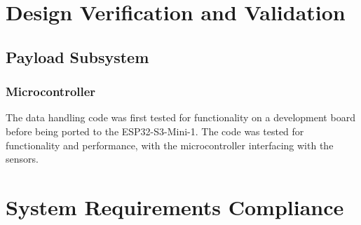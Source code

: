 \documentclass{report}
\begin{document}
    \chapter{Design Verification and Validation}
        \section{Payload Subsystem}
            \subsection{Microcontroller}
                The data handling code was first tested for functionality
                on a development board before being ported to the 
                ESP32-S3-Mini-1. The code was tested for functionality
                and performance, with the microcontroller interfacing
                with the sensors.
        \chapter{System Requirements Compliance}
    \printbibliography
\end{document}
